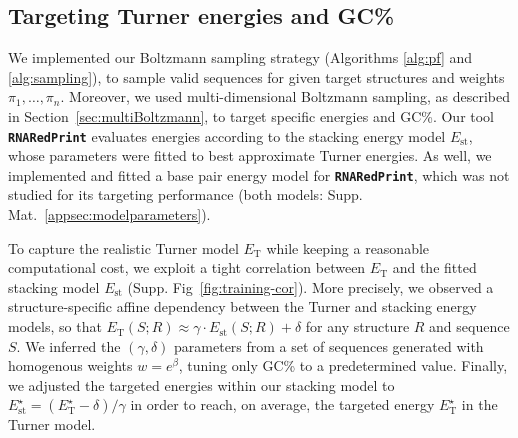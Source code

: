 \documentclass{bioinfo}
\newcommand{\Nuc}[1]{{\sf #1}}
\newcommand{\Cb}{\Nuc{C}}
\newcommand{\Gb}{\Nuc{G}}
\newcommand{\GCb}{\Gb\Cb}
\newcommand{\ourprog}{{\tt \bfseries{}\color{black!75}RNA\textcolor{red!70!black}{Red}Print}}
\newcommand{\EnergyTurner}{E_{\text{T}}}
\newcommand{\EnergyStacking}{E_{\text{st}}}
\begin{document}
\subsection{Targeting Turner energies and \GCb\%}
We implemented our Boltzmann sampling strategy (Algorithms
\ref{alg:pf} and \ref{alg:sampling}), to sample valid sequences for
given target structures and weights $\pi_1,\dots,\pi_n$.  Moreover, we
used multi-dimensional Boltzmann sampling, as described in
Section~\ref{sec:multiBoltzmann}, to target specific energies and
\GCb\%.  Our tool \ourprog{} evaluates energies according to the
stacking energy model $\EnergyStacking$, whose parameters were fitted
to best approximate Turner energies. As well, we implemented and
fitted a base pair energy model for \ourprog{}, which was not studied
for its targeting performance (both models:
Supp. Mat.~\ref{appsec:modelparameters}).
%
%

To capture the realistic Turner model $\EnergyTurner$ while keeping
a reasonable computational cost, we exploit a tight correlation between
$\EnergyTurner$ and the fitted stacking model $\EnergyStacking$
(Supp. Fig~\ref{fig:training-cor}). More precisely, we observed a
structure-specific affine dependency between the Turner and stacking
energy models, so that
$\EnergyTurner(S;R) \approx \gamma\cdot \EnergyStacking(S;R) + \delta$
for any structure $R$ and sequence $S$. We inferred the
$(\gamma,\delta)$ parameters from a set of sequences generated with
homogenous weights $w=e^{\beta}$, tuning only \GCb\% to a
predetermined value.  Finally, we adjusted the targeted energies
within our stacking model to
$\EnergyStacking^{\star} = (\EnergyTurner^{\star}- \delta)/\gamma$ in
order to reach, on average, the targeted energy
$\EnergyTurner^{\star}$ in the Turner model.
\end{document}
